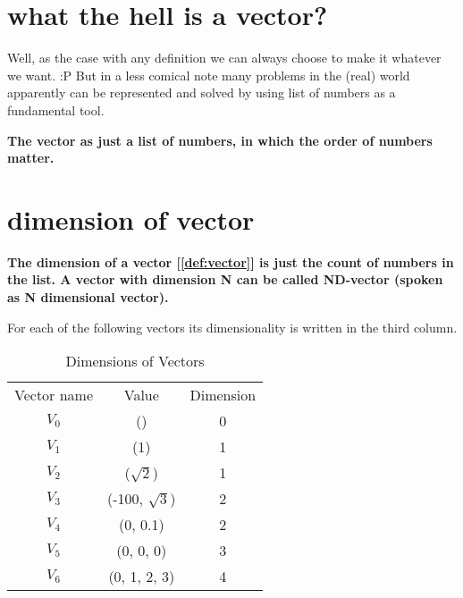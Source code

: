 \documentclass[../main.tex]{subfiles}
\begin{document}
\section{what the hell is a vector?}

Well, as the case with any definition we can always choose to make it whatever we want. :P
But in a less comical note many problems in the (real) world apparently can be represented and solved by using list of numbers as a fundamental tool.

\begin{definition}
  \label{def:vector}

  \textbf{The vector as just a list of numbers, in which the order of numbers matter.}

\end{definition}


\section{dimension of vector}
\begin{definition}
  \label{def:vector_dimension}

  \textbf{The dimension of a vector [\ref{def:vector}] is just the count of numbers in the list.
A vector with dimension N can be called ND-vector (spoken as N dimensional vector).}

\end{definition}

For each of the following vectors its dimensionality is written in the third column.

\begin{table}[ht]
  \centering
  \begin{tabular}{ c  c  c }
    Vector name & Value & Dimension\\
    $ V_0 $ & () & 0\\
    $ V_1 $ & (1) & 1\\
    $ V_2 $ & ($\sqrt{2}$) & 1\\
    $ V_3 $ & (-100, $\sqrt{3}$) & 2\\
    $ V_4 $ & (0, 0.1) & 2\\
    $ V_5 $ & (0, 0, 0) & 3\\
    $ V_6 $ & (0, 1, 2, 3) & 4\\
  \end{tabular}
\caption{Dimensions of Vectors}
\label{tab:dim}
\end{table}
\end{document}
